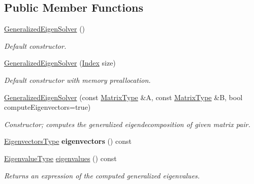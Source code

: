\subsection*{Public Member Functions}
\begin{DoxyCompactItemize}
\item 
\mbox{\hyperlink{class_eigen_1_1_generalized_eigen_solver_ae745f39da43f9df192cc2875d82b4cf1}{Generalized\+Eigen\+Solver}} ()
\begin{DoxyCompactList}\small\item\em Default constructor. \end{DoxyCompactList}\item 
\mbox{\hyperlink{class_eigen_1_1_generalized_eigen_solver_aab6423ded30275cd4cdd31758c278694}{Generalized\+Eigen\+Solver}} (\mbox{\hyperlink{class_eigen_1_1_generalized_eigen_solver_a46a0ff3841059479ec314e56a5645302}{Index}} size)
\begin{DoxyCompactList}\small\item\em Default constructor with memory preallocation. \end{DoxyCompactList}\item 
\mbox{\hyperlink{class_eigen_1_1_generalized_eigen_solver_a2a3528cbf75f66d3a60af9dc7b12ff65}{Generalized\+Eigen\+Solver}} (const \mbox{\hyperlink{class_eigen_1_1_generalized_eigen_solver_a56f4b9823bb9a267de3aaf48428cd247}{Matrix\+Type}} \&A, const \mbox{\hyperlink{class_eigen_1_1_generalized_eigen_solver_a56f4b9823bb9a267de3aaf48428cd247}{Matrix\+Type}} \&B, bool compute\+Eigenvectors=true)
\begin{DoxyCompactList}\small\item\em Constructor; computes the generalized eigendecomposition of given matrix pair. \end{DoxyCompactList}\item 
\mbox{\label{class_eigen_1_1_generalized_eigen_solver_a33a89a59e7e49f0752c55f6c6cb65754}} 
\mbox{\hyperlink{class_eigen_1_1_generalized_eigen_solver_afffec018dbb2d87b4c09b6acecbb79cd}{Eigenvectors\+Type}} {\bfseries eigenvectors} () const
\item 
\mbox{\hyperlink{class_eigen_1_1_generalized_eigen_solver_ad59af178acc401f1bc4e330ef80f286d}{Eigenvalue\+Type}} \mbox{\hyperlink{class_eigen_1_1_generalized_eigen_solver_a62f01cd78271efd5e39bcb24e0fe1a58}{eigenvalues}} () const
\begin{DoxyCompactList}\small\item\em Returns an expression of the computed generalized eigenvalues. \end{DoxyCompactList}\item 

\end{DoxyCompactItemize}
